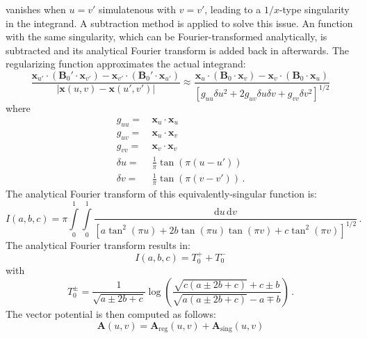 vanishes when $u = v'$ simulatenous with $v = v'$, leading to a $1/x$-type singularity in the integrand.
A subtraction method is applied to solve this issue.
An function with the same singularity, which can be Fourier-transformed analytically,
is subtracted and its analytical Fourier transform is added back in afterwards.
The regularizing function approximates the actual integrand:
\begin{equation}
  \frac{  \mathbf{x}_{u'} \cdot \left( \mathbf{B}_0' \cdot \mathbf{x}_{v'} \right)
        - \mathbf{x}_{v'} \cdot \left( \mathbf{B}_0' \cdot \mathbf{x}_{u'} \right) }
       {|\mathbf{x}(u,v) - \mathbf{x}(u',v')|}
  \approx
  \frac{  \mathbf{x}_{u} \cdot \left( \mathbf{B}_0 \cdot \mathbf{x}_{v} \right)
        - \mathbf{x}_{v} \cdot \left( \mathbf{B}_0 \cdot \mathbf{x}_{u} \right)}
       {\left[ g_{uu} \delta u^2 + 2 g_{uv} \delta u \delta v + g_{vv} \delta v^2 \right]^{1/2} }
\end{equation}
where
\begin{align}
 g_{uu} =&\, \mathbf{x}_{u} \cdot \mathbf{x}_{u} \\
 g_{uv} =&\, \mathbf{x}_{u} \cdot \mathbf{x}_{v} \\
 g_{vv} =&\, \mathbf{x}_{v} \cdot \mathbf{x}_{v} \\
 \delta u =&\, \frac{1}{\pi} \tan\left(\pi (u - u') \right) \\
 \delta v =&\, \frac{1}{\pi} \tan\left(\pi (v - v') \right) \, .
\end{align}
The analytical Fourier transform of this equivalently-singular function is:
\begin{equation}
 I(a,b,c) = \pi \int\limits_0^1 \int\limits_0^1
   \frac{\mathrm{d}u \,\mathrm{d}v}
        {\left[ a \tan^2(\pi u) + 2 b \tan(\pi u) \tan(\pi v) + c \tan^2(\pi v) \right]^{1/2} } \, .
\end{equation}
The analytical Fourier transform results in:
\begin{equation}
 I(a,b,c) = T_{0}^{+} + T_{0}^{-}
\end{equation}
with
\begin{equation}
 T_{0}^{\pm} = \frac{1}{\sqrt{a \pm 2b + c}} \log\left(
   \frac{\sqrt{c \left(a \pm 2b + c\right)} + c \pm b}
        {\sqrt{a \left(a \pm 2b + c\right)} - a \mp b} \right) \, .
\end{equation}
The vector potential is then computed as follows:
\begin{equation}
 \mathbf{A}(u,v) = \mathbf{A}_\textrm{reg}(u,v) + \mathbf{A}_\textrm{sing}(u,v)
\end{equation}
